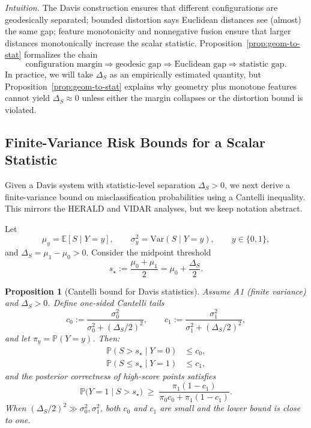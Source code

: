 \documentclass[11pt]{article}
\newcommand{\Prob}{\mathbb{P}}
\newcommand{\Var}{\mathrm{Var}}
\newtheorem{proposition}{Proposition}
\begin{document}
\noindent\emph{Intuition.} The Davis construction ensures that different configurations are
geodesically separated; bounded distortion says Euclidean distances see (almost) the same gap;
feature monotonicity and nonnegative fusion ensure that larger distances monotonically increase
the scalar statistic. Proposition~\ref{prop:geom-to-stat} formalizes the chain
\[
\text{configuration margin} \Rightarrow
\text{geodesic gap} \Rightarrow
\text{Euclidean gap} \Rightarrow
\text{statistic gap}.
\]
In practice, we will take $\Delta_S$ as an empirically estimated quantity, but
Proposition~\ref{prop:geom-to-stat} explains why geometry plus monotone features cannot yield
$\Delta_S \approx 0$ unless either the margin collapses or the distortion bound is violated.

\subsection{Finite-Variance Risk Bounds for a Scalar Statistic}
\label{subsec:cantelli}

Given a Davis system with statistic-level separation $\Delta_S > 0$, we next derive a finite-variance
bound on misclassification probabilities using a Cantelli inequality. This mirrors the HERALD
and VIDAR analyses, but we keep notation abstract.

Let
\[
\mu_y = \mathbb{E}[S \mid Y=y],\qquad
\sigma_y^2 = \Var(S \mid Y=y),\qquad y \in \{0,1\},
\]
and $\Delta_S = \mu_1 - \mu_0 > 0$. Consider the midpoint threshold
\[
s_\star := \frac{\mu_0 + \mu_1}{2} = \mu_0 + \frac{\Delta_S}{2}.
\]

\begin{proposition}[Cantelli bound for Davis statistics]
\label{prop:davis-cantelli}
Assume A1 (finite variance) and $\Delta_S > 0$. Define one-sided Cantelli tails
\[
c_0 := \frac{\sigma_0^2}{\sigma_0^2 + (\Delta_S/2)^2},\qquad
c_1 := \frac{\sigma_1^2}{\sigma_1^2 + (\Delta_S/2)^2},
\]
and let $\pi_y = \Prob(Y=y)$. Then:
\begin{align*}
\Prob(S > s_\star \mid Y=0) &\le c_0,\\
\Prob(S \le s_\star \mid Y=1) &\le c_1,
\end{align*}
and the posterior correctness of high-score points satisfies
\[
\Prob\bigl(Y=1 \mid S > s_\star\bigr)
\;\ge\;
\frac{\pi_1 (1-c_1)}
     {\pi_0 c_0 + \pi_1 (1-c_1)}.
\]
When $(\Delta_S/2)^2 \gg \sigma_0^2,\sigma_1^2$, both $c_0$ and $c_1$ are small and the lower
bound is close to one.
\end{proposition}
\end{document}
